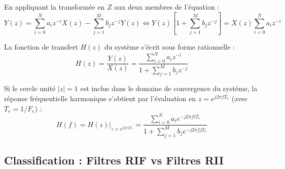 En appliquant la transformée en $Z$ aux deux membres de l'équation :
$$ Y(z) = \sum_{i=0}^N a_i z^{-i} X(z) - \sum_{j=1}^M b_j z^{-j} Y(z) \iff Y(z) \left[ 1 + \sum_{j=1}^M b_j z^{-j} \right] = X(z) \sum_{i=0}^N a_i z^{-i} $$

\begin{definition}
    La fonction de transfert $H(z)$ du système s'écrit sous forme rationnelle :
        \begin{equation}
            \boxed{H(z) = \frac{Y(z)}{X(z)} = \frac{\sum_{i=0}^N a_i z^{-i}}{1 + \sum_{j=1}^M b_j z^{-j}}}
        \end{equation}
\end{definition}

\begin{remark}
    Si le cercle unité $|z| = 1$ est inclus dans le domaine de convergence du système, la réponse fréquentielle harmonique s'obtient par l'évaluation en $z = e^{j 2 \pi f T_e}$ (avec $T_e = 1/F_e$) :
    \begin{equation}
        H(f) = H(z)\Big|_{z = e^{j 2\pi f T_e}} = \frac{\sum_{i=0}^N a_i e^{-j 2\pi f i T_e}}{1 + \sum_{j=1}^M b_j e^{-j 2\pi f j T_e}}
    \end{equation}
\end{remark}

\subsection{Classification : Filtres RIF vs Filtres RII}

